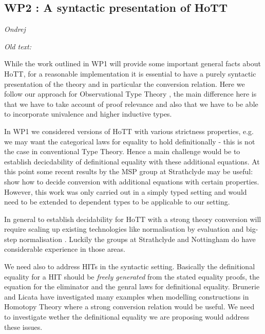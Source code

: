\documentclass[twocolumn,a4paper,11pt]{article}
\begin{document}
\subsection*{WP2 : A syntactic presentation of HoTT}

\emph{Ondrej}


\emph{Old text:}

While the work outlined in WP1 will provide some important general
facts about HoTT, for a reasonable implementation it is essential to
have a purely syntactic presentation of the theory and in particular
the conversion relation. Here we follow our approach for Observational
Type Theory \cite{PLPV07}, the main difference here is that we have to
take account of proof relevance and also that we have to be able to
incorporate univalence and higher inductive types. 

In WP1 we considered versions of HoTT with various strictness
properties, e.g. we may want the categorical laws for equality to hold
definitionally - this is not the case in conventional Type
Theory. Hence a main challenge would be to establish decicdability of
definitional equality with these additional equations. At this point
some recent results by the MSP group at Strathclyde may be useful: \cite{ConorPierre}
show how to decide conversion with additional equations with certain
properties. However, this work was only carried out in a simply typed
setting and would need to be extended to dependent types to be
applicable to our setting.

In general to establish decidability for HoTT with a strong theory
conversion will require scaling up existing technologies like
normalisation by evaluation \cite{nbe} and big-step normalisation
\cite{big-step}. Luckily the groups at Strathclyde and Nottingham do
have considerable experience in those areas.

We need also to address HITs in the syntactic setting. Basically the
definitional equality for a HIT should be \emph{freely generated} from
the stated equality proofs, the equation for the eliminator and the
genral laws for definitional equality. Brunerie and Licata
\cite{hott-examples} have investigated many examples when modelling
constructions in Homotopy Theory where a strong conversion relation
would be useful. We need to investigate wether the definitional
equality we are proposing would address these issues.

\end{document}
